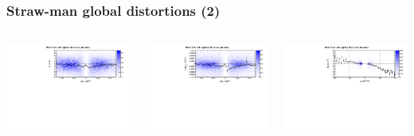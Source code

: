 \documentclass[compress]{beamer}
\begin{document}
\begin{frame}
\frametitle{Straw-man global distortions (2)}

\begin{columns}

\includegraphics[width=\linewidth]{residuals_sagitta.pdf}

\includegraphics[width=\linewidth]{curvature_sagitta.pdf}

\includegraphics[width=\linewidth]{momenta_sagitta.pdf}


\end{columns}
\end{frame}
\end{document}
